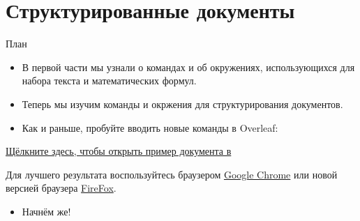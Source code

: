 \documentclass{beamer}
\subtitle{Часть 2: Структурированные документы и ещё кое что}
\begin{document}
\begin{frame}
\titlepage
\end{frame}

\section{Структурированные документы}

\begin{frame}{План}
\begin{multicols}{2}
\tableofcontents[currentsection]
\end{multicols}
\end{frame}

\begin{frame}{\insertsection}
\begin{itemize}
\item В первой части мы узнали о командах и об окружениях, использующихся
  для набора текста и математических формул.
\item Теперь мы изучим команды и окржения для структурирования документов.
\item Как и раньше, пробуйте вводить новые команды в Overleaf:
\end{itemize}
\vspace{2em}
\begin{center}
\begin{printout}
\href{\wlnewdoc{basics.tex}}{Щёлкните здесь, чтобы открыть пример документа в \wllogo{}}
\end{printout}
\scriptsize{}
Для лучшего результата воспользуйтесь браузером
\href{http://www.google.com/chrome}{Google Chrome} или новой версией браузера
\href{http://www.mozilla.org/en-US/firefox/new/}{FireFox}.
\end{center}
\vspace{1ex}
\begin{itemize}
\item Начнём же!
\end{itemize}
\end{frame}
\end{document}
